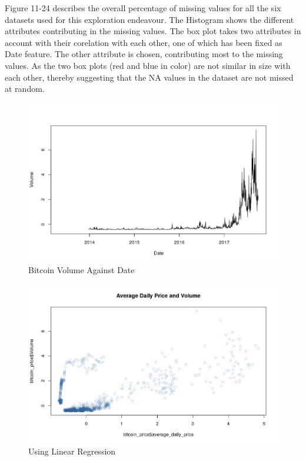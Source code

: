 \documentclass{article}
\begin{document}
\newpage
Figure 11-24 describes the overall percentage of missing values for all the six datasets used for this exploration endeavour. The Histogram shows the different attributes contributing in the missing values. The box plot takes two attributes in account with their corelation with each other, one of which has been fixed as Date feature. The other attribute is chosen, contributing most to the missing values. As the two box plots (red and blue in color) are not similar in size with each other, thereby suggesting that the NA values in the dataset are not missed at random.


\begin{figure}
    \centering
    \includegraphics[width=\linewidth]{bitcoin_price_with_missing_values}
    \caption{Bitcoin Volume Against Date}
    \label{fig:my_label}
\end{figure}



\begin{figure}
    \centering
    \includegraphics[width=\linewidth]{AverageDailyPrice_Volume_AfterFillingMissing.png}
    \caption{Using Linear Regression}
    \label{fig:my_label}
\end{figure}
\end{document}
